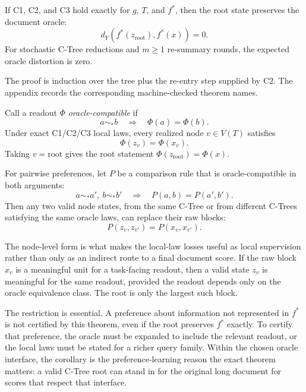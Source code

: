 \begin{theorem}\label{thm:v8-root-preservation}
If C1, C2, and C3 hold exactly for \(g\), \(T\), and \(f^\ast\), then the root
state preserves the document oracle:
\[
  d_Y\!\left(f^\ast(z_{\mathrm{root}}),f^\ast(x)\right)=0 .
\]
For stochastic C-Tree reductions and \(m\ge 1\) re-summary rounds, the
expected oracle distortion is zero.
\end{theorem}

The proof is induction over the tree plus the re-entry step supplied by C2.
The appendix records the corresponding machine-checked theorem names.

\begin{corollary}
\label{cor:v8-preferences-pass-to-root}
Call a readout \(\Phi\) \emph{oracle-compatible} if
\[
  a\sim_\ast b \quad\Longrightarrow\quad \Phi(a)=\Phi(b).
\]
Under exact C1/C2/C3 local laws, every realized node \(v\in V(T)\) satisfies
\[
  \Phi(z_v)=\Phi(x_v).
\]
Taking \(v=\mathrm{root}\) gives the root statement
\(\Phi(z_{\mathrm{root}})=\Phi(x)\).

For pairwise preferences, let \(P\) be a comparison rule that is
oracle-compatible in both arguments:
\[
  a\sim_\ast a',\ b\sim_\ast b'
  \quad\Longrightarrow\quad
  P(a,b)=P(a',b').
\]
Then any two valid node states, from the same C-Tree or from different
C-Trees satisfying the same oracle laws, can replace their raw blocks:
\[
  P(z_v,z_{v'})=P(x_v,x_{v'}).
\]
\end{corollary}

The node-level form is what makes the local-law losses useful as local
supervision rather than only as an indirect route to a final document score. If
the raw block \(x_v\) is a meaningful unit for a task-facing readout, then a
valid state \(z_v\) is meaningful for the same readout, provided the readout
depends only on the oracle equivalence class. The root is only the largest
such block.

The restriction is essential. A preference about information not represented in
\(f^\ast\) is not certified by this theorem, even if the root preserves
\(f^\ast\) exactly. To certify that preference, the oracle must be expanded to
include the relevant readout, or the local laws must be stated for a richer
query family. Within the chosen oracle interface, the corollary is the
preference-learning reason the exact theorem matters: a valid C-Tree root can
stand in for the original long document for scores that respect that interface.

